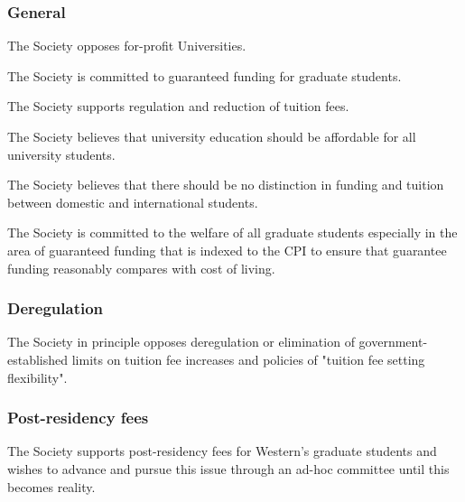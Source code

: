 \subsubsection{General
}
\begin{longenum}[ label*=\thesubsubsection.\arabic*., align=left]
\item 	The Society opposes for-profit Universities. 
\item The Society is committed to guaranteed funding for graduate students.
\item 	The Society supports regulation and reduction of tuition fees.
\item The Society believes that university education should be affordable for all university students.
\item The Society believes that there should be no distinction in funding and tuition between domestic and international students.
\item The Society is committed to the welfare of all graduate students especially in the area of guaranteed funding that is indexed to the CPI to ensure that guarantee funding reasonably compares with cost of living.
\end{longenum}

\subsubsection{Deregulation}
\begin{longenum}[ label*=\thesubsubsection.\arabic*., align=left]
\item The Society in principle opposes deregulation or elimination of government-established limits on tuition fee increases and policies of "tuition fee setting flexibility". 
\end{longenum}
\subsubsection{Post-residency fees}
\begin{longenum}[ label*=\thesubsubsection.\arabic*., align=left]
\item	The Society supports post-residency fees for Western's graduate students and wishes to advance and pursue this issue through an ad-hoc committee until this becomes reality. 
\end{longenum}
